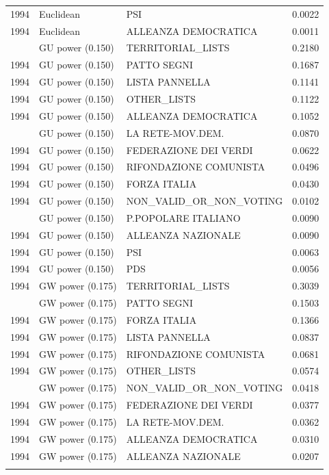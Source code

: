 \begin{longtable}[t]{rllr}
1994 & Euclidean & PSI & 0.0022\\
1994 & Euclidean & ALLEANZA DEMOCRATICA & 0.0011\\
\addlinespace
1994 & GU power (0.150) & TERRITORIAL\_LISTS & 0.2180\\
1994 & GU power (0.150) & PATTO SEGNI & 0.1687\\
1994 & GU power (0.150) & LISTA PANNELLA & 0.1141\\
1994 & GU power (0.150) & OTHER\_LISTS & 0.1122\\
1994 & GU power (0.150) & ALLEANZA DEMOCRATICA & 0.1052\\
\addlinespace
1994 & GU power (0.150) & LA RETE-MOV.DEM. & 0.0870\\
1994 & GU power (0.150) & FEDERAZIONE DEI VERDI & 0.0622\\
1994 & GU power (0.150) & RIFONDAZIONE COMUNISTA & 0.0496\\
1994 & GU power (0.150) & FORZA ITALIA & 0.0430\\
1994 & GU power (0.150) & NON\_VALID\_OR\_NON\_VOTING & 0.0102\\
\addlinespace
1994 & GU power (0.150) & P.POPOLARE ITALIANO & 0.0090\\
1994 & GU power (0.150) & ALLEANZA NAZIONALE & 0.0090\\
1994 & GU power (0.150) & PSI & 0.0063\\
1994 & GU power (0.150) & PDS & 0.0056\\
1994 & GW power (0.175) & TERRITORIAL\_LISTS & 0.3039\\
\addlinespace
1994 & GW power (0.175) & PATTO SEGNI & 0.1503\\
1994 & GW power (0.175) & FORZA ITALIA & 0.1366\\
1994 & GW power (0.175) & LISTA PANNELLA & 0.0837\\
1994 & GW power (0.175) & RIFONDAZIONE COMUNISTA & 0.0681\\
1994 & GW power (0.175) & OTHER\_LISTS & 0.0574\\
\addlinespace
1994 & GW power (0.175) & NON\_VALID\_OR\_NON\_VOTING & 0.0418\\
1994 & GW power (0.175) & FEDERAZIONE DEI VERDI & 0.0377\\
1994 & GW power (0.175) & LA RETE-MOV.DEM. & 0.0362\\
1994 & GW power (0.175) & ALLEANZA DEMOCRATICA & 0.0310\\
1994 & GW power (0.175) & ALLEANZA NAZIONALE & 0.0207\\
\addlinespace

\end{longtable}
